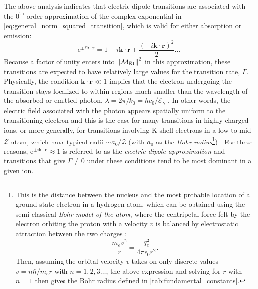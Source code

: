 The above analysis indicates that electric-dipole transitions are associated with the $0^{\text{th}}$-order approximation of the complex exponential in \cref{eq:general_norm_squared_transition}, which is valid for either absorption or emission: 
\begin{equation}\label{eq:Taylor_complex_exponential}
 \mathrm{e}^{\pm i \mathbold{k} \cdot \mathbold{r}} = 1 \pm i \mathbold{k} \cdot \mathbold{r} + \frac{\left( \pm i \mathbold{k} \cdot \mathbold{r} \right)^2}{2} \dotsc 
 \end{equation} 
Because a factor of unity enters into $\norm{\mathcal{M}_{\text{E}1}}^2$ in this approximation, these transitions are expected to have relatively large values for the transition rate, $\Gamma$.   
Physically, the condition $\mathbold{k} \cdot \mathbold{r} \ll 1$ implies that the electron undergoing the transition stays localized to within regions much smaller than the wavelength of the absorbed or emitted photon, $\lambda = 2 \pi / k_0 = h c_0 / \mathcal{E}_{\gamma}$  \cite{Shankar04,Townsend00}. 
In other words, the electric field associated with the photon appears spatially uniform to the transitioning electron and this is the case for many transitions in highly-charged ions, or more generally, for transitions involving K-shell electrons in a low-to-mid $\mathcal{Z}$ atom, which have typical radii $\sim a_0 / \mathcal{Z}$ (with $a_0$ as the \emph{Bohr radius}\footnote{This is the distance between the nucleus and the most probable location of a ground-state electron in a hydrogen atom, which can be obtained using the semi-classical \emph{Bohr model of the atom}, where the centripetal force felt by the electron orbiting the proton with a velocity $v$ is balanced by electrostatic attraction between the two charges \cite{Shankar04,Griffiths05}: %
\begin{equation*}\label{eq:Bohr_model}
 \frac{m_e v^2}{r} = \frac{q_e^2}{4 \pi \epsilon_0 r^2} .
 \end{equation*}
Then, assuming the orbital velocity $v$ takes on only discrete values $v = n \hbar / m_e r$ with $n=1,2,3\dotsc$, the above expression and solving for $r$ with $n=1$ then gives the Bohr radius defined in \cref{tab:fundamental_constants}.}) \cite{Attwood17}. 
For these reasons, $\mathrm{e}^{\pm i \mathbold{k} \cdot \mathbold{r}} \approx 1$ is referred to as the \emph{electric-dipole approximation} and transitions that give $\Gamma \neq 0$ under these conditions tend to be most dominant in a given ion. 

